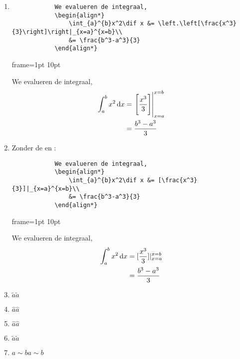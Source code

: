 \documentclass{article}
\newenvironment{demobox}{
    \begin{adjustbox}{frame=1pt 10pt}%
        \begin{minipage}{\linewidth-22pt}
}{
        \end{minipage}
    \end{adjustbox}
}
\begin{document}
\begin{enumerate}
\begin{demobox}
        \end{demobox}
        \item \begin{verbatim}
            We evalueren de integraal,
            \begin{align*}
                \int_{a}^{b}x^2\dif x &= \left.\left[\frac{x^3}{3}\right]\right|_{x=a}^{x=b}\\
                &= \frac{b^3-a^3}{3}
            \end{align*}
        \end{verbatim}
        \begin{demobox}
            We evalueren de integraal,
            \begin{align*}
                \int_{a}^{b}x^2\dif x &= \left.\left[\frac{x^3}{3}\right]\right|_{x=a}^{x=b}\\
                &= \frac{b^3-a^3}{3}
            \end{align*}
        \end{demobox}
        \item Zonder de \texttt{\left} en \texttt{\right}:        
        \begin{verbatim}
            We evalueren de integraal,
            \begin{align*}
                \int_{a}^{b}x^2\dif x &= [\frac{x^3}{3}]|_{x=a}^{x=b}\\
                &= \frac{b^3-a^3}{3}
            \end{align*}
        \end{verbatim}
        \begin{demobox}
            We evalueren de integraal,
            \begin{align*}
                \int_{a}^{b}x^2\dif x &= [\frac{x^3}{3}]|_{x=a}^{x=b}\\
                &= \frac{b^3-a^3}{3}
            \end{align*}
        \end{demobox}
        \item \texttt{$ \tilde{a} $}\qquad $ \tilde{a} $
        \item \texttt{$ \hat{a} $}\qquad $ \hat{a} $
        \item \texttt{$ \widehat{a} $}\qquad $ \widehat{a} $
        \item \texttt{$ \widetilde{a} $}\qquad $ \widetilde{a} $
        \item \texttt{$ a\sim b $}\qquad $ a\sim b $

\end{enumerate}
\end{document}
